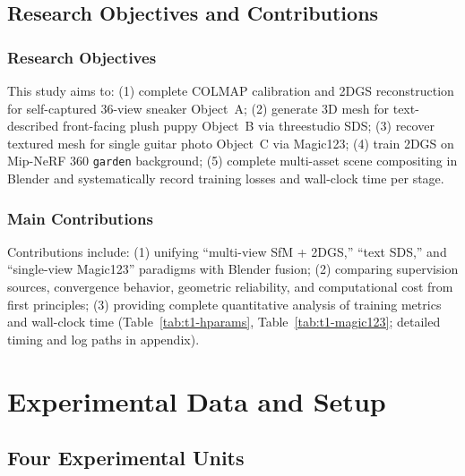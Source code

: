 \documentclass[10pt,twocolumn,letterpaper]{article}
\newcommand{\tabref}[1]{Table~\ref{#1}}
\begin{document}
\subsection{Research Objectives and Contributions}

\subsubsection{Research Objectives}

This study aims to: (1) complete COLMAP calibration and 2DGS reconstruction for self-captured 36-view sneaker Object~A; (2) generate 3D mesh for text-described front-facing plush puppy Object~B via threestudio SDS; (3) recover textured mesh for single guitar photo Object~C via Magic123; (4) train 2DGS on Mip-NeRF 360 \texttt{garden} background; (5) complete multi-asset scene compositing in Blender and systematically record training losses and wall-clock time per stage.

\subsubsection{Main Contributions}

Contributions include: (1) unifying ``multi-view SfM + 2DGS,'' ``text SDS,'' and ``single-view Magic123'' paradigms with Blender fusion; (2) comparing supervision sources, convergence behavior, geometric reliability, and computational cost from first principles; (3) providing complete quantitative analysis of training metrics and wall-clock time (\tabref{tab:t1-hparams}, \tabref{tab:t1-magic123}; detailed timing and log paths in appendix).

\section{Experimental Data and Setup}
\label{sec:t1-dataset}

\subsection{Four Experimental Units}
\end{document}
